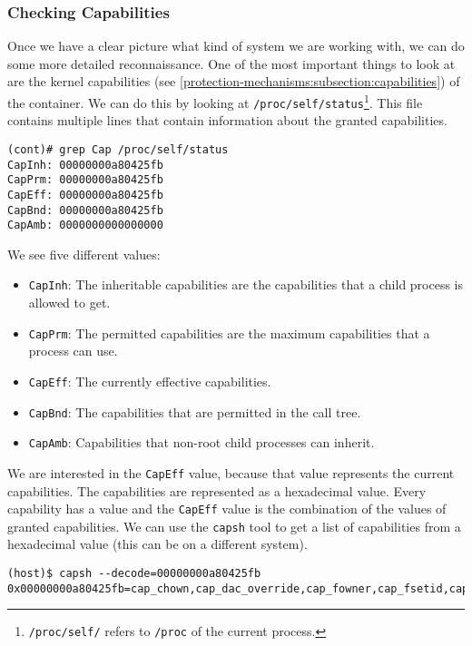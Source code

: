 \subsubsection{Checking Capabilities}
Once we have a clear picture what kind of system we are working with, we can do some more detailed reconnaissance. One of the most important things to look at are the kernel capabilities (see \autoref{protection-mechanisms:subsection:capabilities}) of the container. We can do this by looking at \lstinline{/proc/self/status}\footnote{\lstinline{/proc/self/} refers to \lstinline{/proc} of the current process.}. This file contains multiple lines that contain information about the granted capabilities.

\begin{lstlisting}[caption={Capabilities of process in container.},captionpos=b]
(cont)# grep Cap /proc/self/status
CapInh:	00000000a80425fb
CapPrm:	00000000a80425fb
CapEff:	00000000a80425fb
CapBnd:	00000000a80425fb
CapAmb:	0000000000000000
\end{lstlisting}

We see five different values:
\begin{itemize}
    \item \lstinline{CapInh}: The inheritable capabilities are the capabilities that a child process is allowed to get.
    \item \lstinline{CapPrm}: The permitted capabilities are the maximum capabilities that a process can use.
    \item \lstinline{CapEff}: The currently effective capabilities.
    \item \lstinline{CapBnd}: The capabilities that are permitted in the call tree.
    \item \lstinline{CapAmb}: Capabilities that non-root child processes can inherit.
\end{itemize}

We are interested in the \lstinline{CapEff} value, because that value represents the current capabilities. The capabilities are represented as a hexadecimal value. Every capability has a value and the \lstinline{CapEff} value is the combination of the values of granted capabilities. We can use the \lstinline{capsh} tool to get a list of capabilities from a hexadecimal value (this can be on a different system).

\begin{lstlisting}[caption={\lstinline{capsh} shows capabilities.},captionpos=b]
(host)$ capsh --decode=00000000a80425fb
0x00000000a80425fb=cap_chown,cap_dac_override,cap_fowner,cap_fsetid,cap_kill,cap_setgid,cap_setuid,cap_setpcap,cap_net_bind_service,cap_net_raw,cap_sys_chroot,cap_mknod,cap_audit_write,cap_setfcap
\end{lstlisting}

